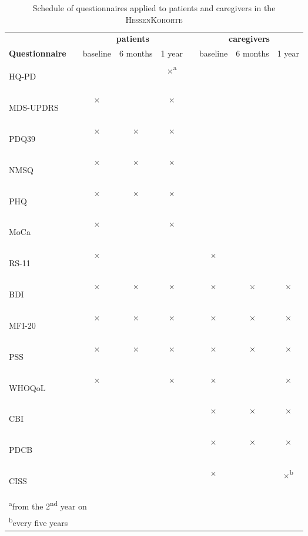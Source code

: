 \newcommand{\FC}{$\times$}
\newcommand{\FCa}{\textsuperscript{\phantom{a}}\FC{}\textsuperscript{a}}
\newcommand{\FCb}{\textsuperscript{\phantom{b}}\FC{}\textsuperscript{b}}
\newcommand{\emC}{}
\newcommand{\acb}[1]{\acs{#1}: \acl{#1}}
\newcommand{\acv}[1]{\begin{NoHyper}\acs{#1}\end{NoHyper}}
\begin{table}[H]
\begin{tabular}{lcccccccc}
\caption{Schedule of questionnaires applied to patients and caregivers in the \textsc{HessenKohorte}}
\label{tab:questionnaireSchedule}\\
\textbf{} & & \multicolumn{3}{c}{\textbf{patients}} & & \multicolumn{3}{c}{\textbf{caregivers}} \\[1em]
\textbf{Questionnaire}& & baseline & 6 months & 1 year  & & baseline   & 6 months & 1 year \\[1em]
\acv{HQ-PD}           & & \emC{}   & \emC{}   & \FCa{}  & & \emC{}     & \emC{}   & \emC{} \\
\acv{MDS-UPDRS}       & & \FC{}    & \emC{}   & \FC{}   & & \emC{}     & \emC{}   & \emC{} \\
\acv{PDQ39}           & & \FC{}    & \FC{}    & \FC{}   & & \emC{}     & \emC{}   & \emC{} \\
\acv{NMSQ}            & & \FC{}    & \FC{}    & \FC{}   & & \emC{}     & \emC{}   & \emC{} \\
\acv{PHQ}             & & \FC{}    & \FC{}    & \FC{}   & & \emC{}     & \emC{}   & \emC{} \\
\acv{MoCa}            & & \FC{}    & \emC{}   & \FC{}   & & \emC{}     & \emC{}   & \emC{} \\
\acv{RS-11}           & & \FC{}    & \emC{}   & \emC{}  & & \FC{}      & \emC{}   & \emC{} \\
\acv{BDI}             & & \FC{}    & \FC{}    & \FC{}   & & \FC{}      & \FC{}    & \FC{}  \\
\acv{MFI-20}          & & \FC{}    & \FC{}    & \FC{}   & & \FC{}      & \FC{}    & \FC{}  \\
\acv{PSS}             & & \FC{}    & \FC{}    & \FC{}   & & \FC{}      & \FC{}    & \FC{}  \\ 
\acv{WHOQoL}          & & \FC{}    & \emC{}   & \FC{}   & & \FC{}      & \emC{}   & \FC{}  \\
\acv{CBI}             & & \emC{}   & \emC{}   & \emC{}  & & \FC{}      & \FC{}    & \FC{}  \\
\acv{PDCB}            & & \emC{}   & \emC{}   & \emC{}  & & \FC{}      & \FC{}    & \FC{}  \\                              
\acv{CISS}            & & \emC{}   & \emC{}   & \emC{}  & & \FC{}      & \emC{}   & \FCb{} \\
\bottomrule
\multicolumn{9}{l}{\footnotesize{\textsuperscript{a}from the 2\textsuperscript{nd} year on}} \\
\multicolumn{9}{l}{\footnotesize{\textsuperscript{b}every five years}} \\
\end{tabular}


\end{table}
